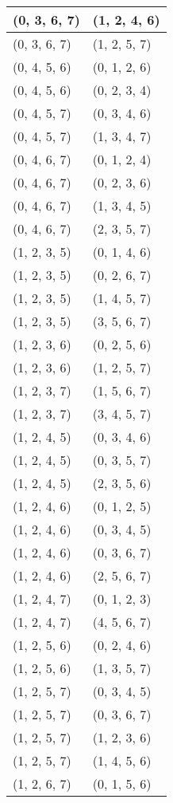 \begin{footnotesize}
\begin{longtable}[c]{|l|l|}
(0, 3, 6, 7)
&(1, 2, 4, 6)
\\ \hline
(0, 3, 6, 7)
&(1, 2, 5, 7)
\\ \hline
(0, 4, 5, 6)
&(0, 1, 2, 6)
\\ \hline
(0, 4, 5, 6)
&(0, 2, 3, 4)
\\ \hline
(0, 4, 5, 7)
&(0, 3, 4, 6)
\\ \hline
(0, 4, 5, 7)
&(1, 3, 4, 7)
\\ \hline
(0, 4, 6, 7)
&(0, 1, 2, 4)
\\ \hline
(0, 4, 6, 7)
&(0, 2, 3, 6)
\\ \hline
(0, 4, 6, 7)
&(1, 3, 4, 5)
\\ \hline
(0, 4, 6, 7)
&(2, 3, 5, 7)
\\ \hline
(1, 2, 3, 5)
&(0, 1, 4, 6)
\\ \hline
(1, 2, 3, 5)
&(0, 2, 6, 7)
\\ \hline
(1, 2, 3, 5)
&(1, 4, 5, 7)
\\ \hline
(1, 2, 3, 5)
&(3, 5, 6, 7)
\\ \hline
(1, 2, 3, 6)
&(0, 2, 5, 6)
\\ \hline
(1, 2, 3, 6)
&(1, 2, 5, 7)
\\ \hline
(1, 2, 3, 7)
&(1, 5, 6, 7)
\\ \hline
(1, 2, 3, 7)
&(3, 4, 5, 7)
\\ \hline
(1, 2, 4, 5)
&(0, 3, 4, 6)
\\ \hline
(1, 2, 4, 5)
&(0, 3, 5, 7)
\\ \hline
(1, 2, 4, 5)
&(2, 3, 5, 6)
\\ \hline
(1, 2, 4, 6)
&(0, 1, 2, 5)
\\ \hline
(1, 2, 4, 6)
&(0, 3, 4, 5)
\\ \hline
(1, 2, 4, 6)
&(0, 3, 6, 7)
\\ \hline
(1, 2, 4, 6)
&(2, 5, 6, 7)
\\ \hline
(1, 2, 4, 7)
&(0, 1, 2, 3)
\\ \hline
(1, 2, 4, 7)
&(4, 5, 6, 7)
\\ \hline
(1, 2, 5, 6)
&(0, 2, 4, 6)
\\ \hline
(1, 2, 5, 6)
&(1, 3, 5, 7)
\\ \hline
(1, 2, 5, 7)
&(0, 3, 4, 5)
\\ \hline
(1, 2, 5, 7)
&(0, 3, 6, 7)
\\ \hline
(1, 2, 5, 7)
&(1, 2, 3, 6)
\\ \hline
(1, 2, 5, 7)
&(1, 4, 5, 6)
\\ \hline
(1, 2, 6, 7)
&(0, 1, 5, 6)
\\ \hline

\end{longtable}
\end{footnotesize}
